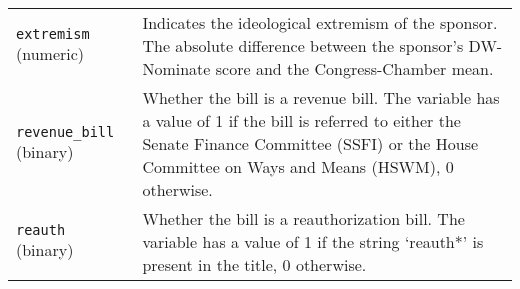 \documentclass[10pt,a4paper]{article}
\begin{document}
\begin{table}[!h]
\begin{tabular}{lL{12cm}}
\texttt{extremism}	(numeric) & Indicates the ideological extremism of the sponsor. The absolute difference between the sponsor's DW-Nominate score and the Congress-Chamber mean. \\
\texttt{revenue\_bill} (binary) & Whether the bill is a revenue bill. The variable has a value of 1 if the bill is referred to either the Senate Finance Committee (SSFI) or the House Committee on Ways and Means (HSWM), 0 otherwise. \\
\texttt{reauth} (binary) & Whether the bill is a reauthorization bill. The variable has a value of 1 if the string `reauth*' is present in the title, 0 otherwise. 
\end{tabular}
\end{table}
\end{document}
